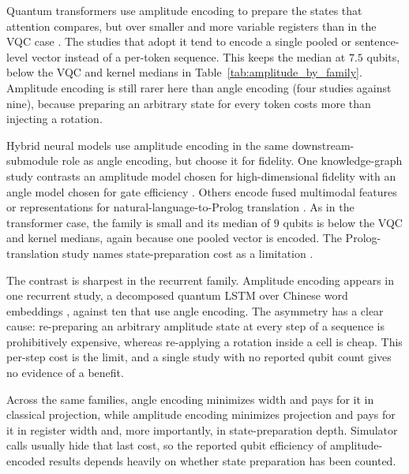 \documentclass{ieeeaccess}
\begin{document}
Quantum transformers use amplitude encoding to prepare the states that attention compares, but over smaller and more variable registers than in the VQC case \cite{zheng_design_2023,sharma_elevating_2025,aktar_hybrid_2026,karanath_q-optbert_2026,karanath_q-entangleformer_2026}.
The studies that adopt it tend to encode a single pooled or sentence-level vector instead of a per-token sequence.
This keeps the median at $7.5$ qubits, below the VQC and kernel medians in Table~\ref{tab:amplitude_by_family}. Amplitude encoding is still rarer here than angle encoding (four studies against nine), because preparing an arbitrary state for every token costs more than injecting a rotation.

Hybrid neural models use amplitude encoding in the same downstream-submodule role as angle encoding, but choose it for fidelity.
One knowledge-graph study contrasts an amplitude model chosen for high-dimensional fidelity with an angle model chosen for gate efficiency \cite{hendl_incorporating_2025}. Others encode fused multimodal features or representations for natural-language-to-Prolog translation \cite{zheng_quantum_2025,ahmed_quantum_2024}.
As in the transformer case, the family is small and its median of $9$ qubits is below the VQC and kernel medians, again because one pooled vector is encoded. The Prolog-translation study names state-preparation cost as a limitation \cite{ahmed_quantum_2024}.

The contrast is sharpest in the recurrent family. Amplitude encoding appears in one recurrent study, a decomposed quantum LSTM over Chinese word embeddings \cite{hou_realization_2022}, against ten that use angle encoding.
The asymmetry has a clear cause: re-preparing an arbitrary amplitude state at every step of a sequence is prohibitively expensive, whereas re-applying a rotation inside a cell is cheap.
This per-step cost is the limit, and a single study with no reported qubit count gives no evidence of a benefit.

Across the same families, angle encoding minimizes width and pays for it in classical projection, while amplitude encoding minimizes projection and pays for it in register width and, more importantly, in state-preparation depth. Simulator calls usually hide that last cost, so the reported qubit efficiency of amplitude-encoded results depends heavily on whether state preparation has been counted.
\end{document}
